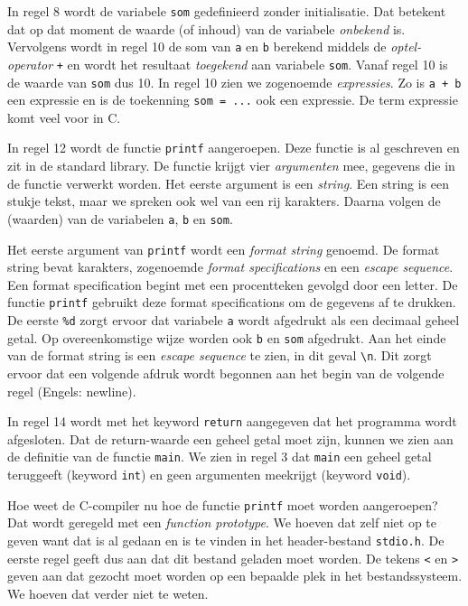 In regel 8 wordt de variabele \texttt{som} gedefinieerd zonder initialisatie. Dat betekent dat op dat moment de waarde (of inhoud) van de variabele \textsl{onbekend} is. Vervolgens wordt in regel 10 de som van \texttt{a} en \texttt{b} berekend middels de \textsl{optel-operator} \texttt{+}\indexop{+} en wordt het resultaat \textsl{toegekend}\indexop{=} aan variabele \texttt{som}. Vanaf regel 10 is de waarde van \texttt{som} dus 10. In regel 10 zien we zogenoemde \textsl{expressies}. Zo is \texttt{a + b} een expressie en is de toekenning \mbox{\texttt{som = ...}} ook een expressie. De term expressie komt veel voor in C.

In regel 12 wordt de functie \texttt{printf} aangeroepen. Deze functie is al geschreven en zit in de standard library. De functie krijgt vier \textsl{argumenten} mee, gegevens die in de functie verwerkt worden. Het eerste argument is een \textsl{string}. Een string is een stukje tekst, maar we spreken ook wel van een rij karakters. Daarna volgen de (waarden) van de variabelen \texttt{a}, \texttt{b} en \texttt{som}.

Het eerste argument van \texttt{printf} wordt een \textsl{format string} genoemd.
De format string bevat karakters, zogenoemde \textsl{format specifications} en een \textsl{escape sequence}. Een format specification begint met een procentteken gevolgd door een letter. De functie \texttt{printf} gebruikt deze format specifications om de gegevens af te drukken. De eerste \texttt{\%d} zorgt ervoor dat variabele \texttt{a} wordt afgedrukt als een decimaal geheel getal. Op overeenkomstige wijze worden ook \texttt{b} en \texttt{som} afgedrukt. Aan het einde van de format string is een \textsl{escape sequence} te zien, in dit geval \texttt{\textbackslash n}. Dit zorgt ervoor dat een volgende afdruk wordt begonnen aan het begin van de volgende regel (Engels: newline).

In regel 14 wordt met het keyword \texttt{return} aangegeven dat het programma wordt afgesloten. 
Dat de return-waarde een geheel getal moet zijn, kunnen we zien aan de definitie van de functie \texttt{main}. We zien in regel 3 dat \texttt{main} een geheel getal teruggeeft (keyword \texttt{int}) en geen argumenten meekrijgt (keyword \texttt{void}).

Hoe weet de C-compiler nu hoe de functie \texttt{printf} moet worden aangeroepen? Dat wordt geregeld met een \textsl{function prototype}. We hoeven dat zelf niet op te geven want dat is al gedaan en is te vinden in het header-bestand \texttt{stdio.h}. De eerste regel geeft dus aan dat dit bestand geladen moet worden. De tekens \texttt{<} en \texttt{>} geven aan dat gezocht moet worden op een bepaalde plek in het bestandssysteem. We hoeven dat verder niet te weten.

